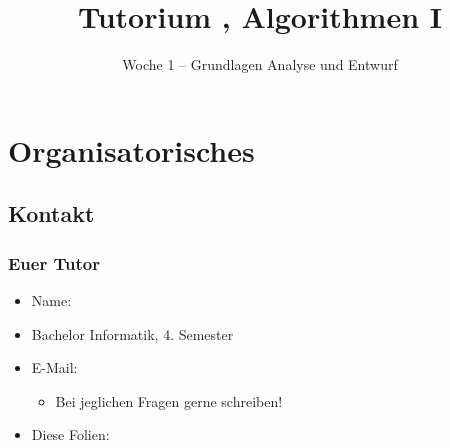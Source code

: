 

\title[Tutorium Algorithmen I]{Tutorium \tutNo, Algorithmen I}
\subtitle{Woche 1 -- Grundlagen Analyse und Entwurf}



\begin{frame}
  \titlepage
\end{frame}


\section{Organisatorisches}
\subsection{Kontakt}
\begin{frame}
  \frametitle{Euer Tutor}
  \begin{itemize}
    \item Name: \authorName
    \item Bachelor Informatik, 4. Semester
    \item E-Mail: \authorEmail
      \begin{itemize}
      \item Bei jeglichen Fragen gerne schreiben!
      \end{itemize}
    \item Diese Folien: \authorHomepage
  \end{itemize}
\end{frame}

